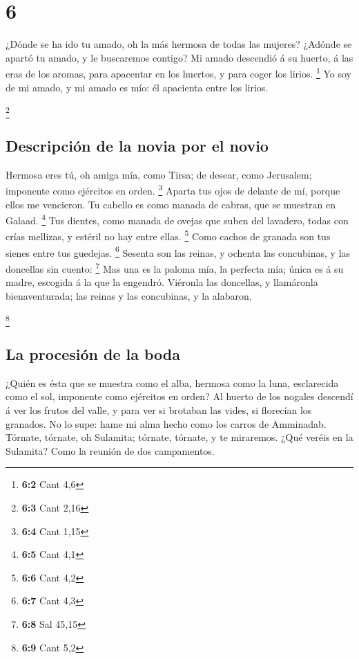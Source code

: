 \hypertarget{section-5}{%
\section{6}\label{section-5}}

 ¿Dónde se ha ido tu amado, oh la más hermosa de todas las
mujeres? ¿Adónde se apartó tu amado, y le buscaremos contigo?
 Mi amado descendió á su huerto, á las eras de los aromas,
para apacentar en los huertos, y para coger los lirios. \footnote{\textbf{6:2}
  Cant 4,6}  Yo soy de mi amado, y mi amado es mío: él
apacienta entre los lirios.

\footnote{\textbf{6:3} Cant 2,16}

\hypertarget{descripciuxf3n-de-la-novia-por-el-novio-1}{%
\subsection{Descripción de la novia por el
novio}\label{descripciuxf3n-de-la-novia-por-el-novio-1}}

 Hermosa eres tú, oh amiga mía, como Tirsa; de desear, como
Jerusalem; imponente como ejércitos en orden. \footnote{\textbf{6:4}
  Cant 1,15}  Aparta tus ojos de delante de mí, porque ellos
me vencieron. Tu cabello es como manada de cabras, que se muestran en
Galaad. \footnote{\textbf{6:5} Cant 4,1}  Tus dientes, como
manada de ovejas que suben del lavadero, todas con crías mellizas, y
estéril no hay entre ellas. \footnote{\textbf{6:6} Cant 4,2}
 Como cachos de granada son tus sienes entre tus guedejas.
\footnote{\textbf{6:7} Cant 4,3}  Sesenta son las reinas, y
ochenta las concubinas, y las doncellas sin cuento: \footnote{\textbf{6:8}
  Sal 45,15}  Mas una es la paloma mía, la perfecta mía;
única es á su madre, escogida á la que la engendró. Viéronla las
doncellas, y llamáronla bienaventurada; las reinas y las concubinas, y
la alabaron.

\footnote{\textbf{6:9} Cant 5,2}

\hypertarget{la-procesiuxf3n-de-la-boda}{%
\subsection{La procesión de la boda}\label{la-procesiuxf3n-de-la-boda}}

 ¿Quién es ésta que se muestra como el alba, hermosa como
la luna, esclarecida como el sol, imponente como ejércitos en orden?
 Al huerto de los nogales descendí á ver los frutos del
valle, y para ver si brotaban las vides, si florecían los granados.
 No lo supe: hame mi alma hecho como los carros de
Amminadab.  Tórnate, tórnate, oh Sulamita; tórnate,
tórnate, y te miraremos. ¿Qué veréis en la Sulamita? Como la reunión de
dos campamentos.

